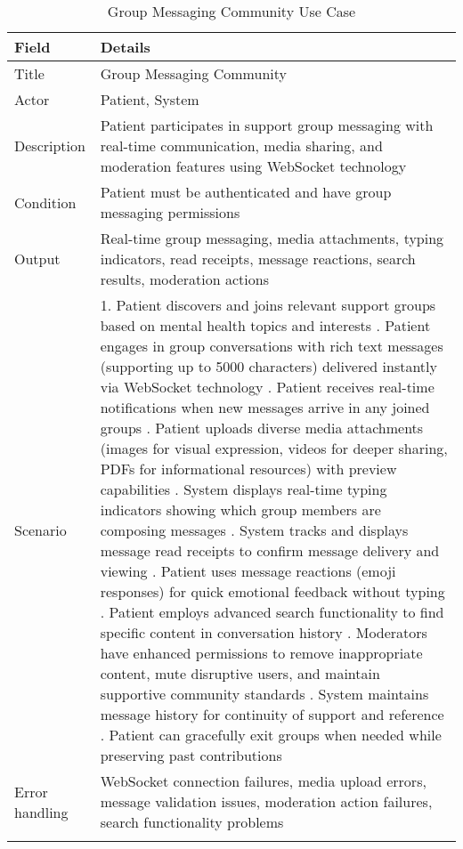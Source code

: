 \begin{longtable}{|p{3cm}|p{12cm}|}
\hline
\textbf{Field} & \textbf{Details} \\
\hline
Title & Group Messaging Community \\
\hline
Actor & Patient, System \\
\hline
Description & Patient participates in support group messaging with real-time communication, media sharing, and moderation features using WebSocket technology \\
\hline
Condition & Patient must be authenticated and have group messaging permissions \\
\hline
Output & Real-time group messaging, media attachments, typing indicators, read receipts, message reactions, search results, moderation actions \\
\hline
Scenario & 1. Patient discovers and joins relevant support groups based on mental health topics and interests \newline 2. Patient engages in group conversations with rich text messages (supporting up to 5000 characters) delivered instantly via WebSocket technology \newline 3. Patient receives real-time notifications when new messages arrive in any joined groups \newline 4. Patient uploads diverse media attachments (images for visual expression, videos for deeper sharing, PDFs for informational resources) with preview capabilities \newline 5. System displays real-time typing indicators showing which group members are composing messages \newline 6. System tracks and displays message read receipts to confirm message delivery and viewing \newline 7. Patient uses message reactions (emoji responses) for quick emotional feedback without typing \newline 8. Patient employs advanced search functionality to find specific content in conversation history \newline 9. Moderators have enhanced permissions to remove inappropriate content, mute disruptive users, and maintain supportive community standards \newline 10. System maintains message history for continuity of support and reference \newline 11. Patient can gracefully exit groups when needed while preserving past contributions \\
\hline
Error handling & WebSocket connection failures, media upload errors, message validation issues, moderation action failures, search functionality problems \\
\hline
\caption{Group Messaging Community Use Case}
\end{longtable}

